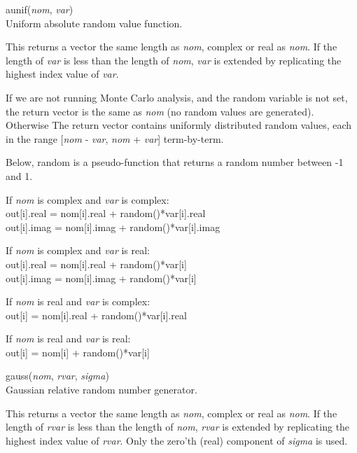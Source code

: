 \begin{description}
\item{\vt aunif}({\it nom\/}, {\it var\/})\\
Uniform absolute random value function.

This returns a vector the same length as {\it nom\/}, complex or real
as {\it nom\/}.  If the length of {\it var} is less than the length of
{\it nom\/}, {\it var} is extended by replicating the highest index
value of {\it var\/}.

If we are not running Monte Carlo analysis, and the {\et random}
variable is not set, the return vector is the same as {\it nom} (no
random values are generated).  Otherwise The return vector contains
uniformly distributed random values, each in the range [{\it nom} -
{\it var\/}, {\it nom} + {\it var\/}] term-by-term.

Below, {\vt random} is a pseudo-function that returns a random number
between -1 and 1.

\begin{description}
\item{If {\it nom} is complex and {\it var} is complex:}\\
  {\vt out[i].real = nom[i].real + random()*var[i].real}\\
  {\vt out[i].imag = nom[i].imag + random()*var[i].imag}

\item{If {\it nom} is complex and {\it var} is real:}\\
  {\vt out[i].real = nom[i].real + random()*var[i]}\\
  {\vt out[i].imag = nom[i].imag + random()*var[i]}

\item{If {\it nom} is real and {\it var} is complex:}\\
  {\vt out[i] = nom[i].real + random()*var[i].real}

\item{If {\it nom} is real and {\it var} is real:}\\
  {\vt out[i] = nom[i] + random()*var[i]}
\end{description}

\item{\vt gauss}({\it nom\/}, {\it rvar\/},
  {\it sigma\/})\\
Gaussian relative random number generator.

This returns a vector the same length as {\it nom\/}, complex or real
as {\it nom\/}.  If the length of {\it rvar} is less than the length
of {\it nom\/}, {\it rvar} is extended by replicating the highest
index value of {\it rvar\/}.  Only the zero'th (real) component of
{\it sigma} is used.


\end{description}
